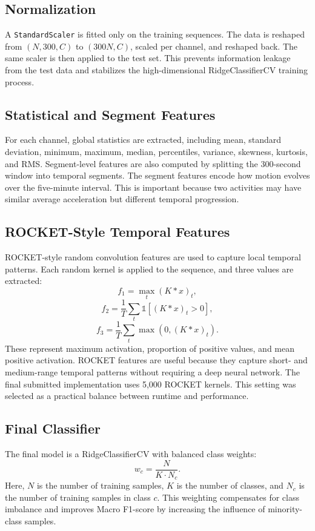 \documentclass[conference]{IEEEtran}
\begin{document}
\subsection{Normalization}
A \texttt{StandardScaler} is fitted only on the training sequences. The data is reshaped from \((N,300,C)\) to \((300N,C)\), scaled per channel, and reshaped back. The same scaler is then applied to the test set. This prevents information leakage from the test data and stabilizes the high-dimensional RidgeClassifierCV training process.
\subsection{Statistical and Segment Features}
For each channel, global statistics are extracted, including mean, standard deviation, minimum, maximum, median, percentiles, variance, skewness, kurtosis, and RMS. Segment-level features are also computed by splitting the 300-second window into temporal segments.
The segment features encode how motion evolves over the five-minute interval. This is important because two activities may have similar average acceleration but different temporal progression.
\subsection{ROCKET-Style Temporal Features}
ROCKET-style random convolution features are used to capture local temporal patterns. Each random kernel is applied to the sequence, and three values are extracted:
\[
f_1 = \max_t (K*x)_t,
\]
\[
f_2 = \frac{1}{T}\sum_t \mathbb{1}[(K*x)_t > 0],
\]
\[
f_3 = \frac{1}{T}\sum_t \max(0,(K*x)_t).
\]
These represent maximum activation, proportion of positive values, and mean positive activation. ROCKET features are useful because they capture short- and medium-range temporal patterns without requiring a deep neural network.
The final submitted implementation uses 5,000 ROCKET kernels. This setting was selected as a practical balance between runtime and performance.
\subsection{Final Classifier}
The final model is a RidgeClassifierCV with balanced class weights:
\[
w_c = \frac{N}{K \cdot N_c}.
\]
Here, \(N\) is the number of training samples, \(K\) is the number of classes, and \(N_c\) is the number of training samples in class \(c\). This weighting compensates for class imbalance and improves Macro F1-score by increasing the influence of minority-class samples.
\end{document}
